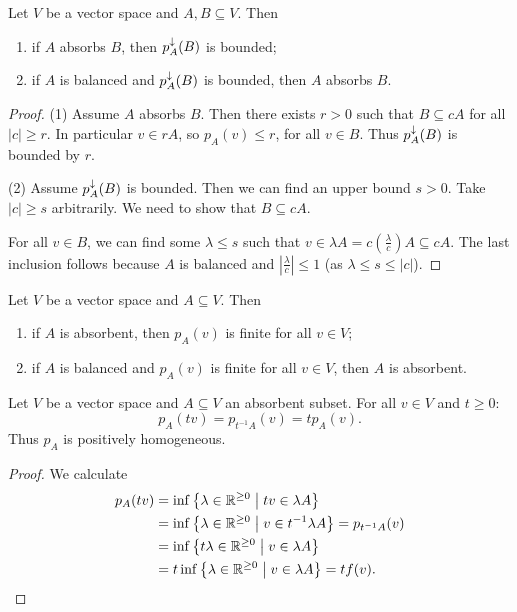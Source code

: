 \begin{lemma}
Let $V$ be a vector space and $A,B\subseteq V$. Then
\begin{enumerate}
\item if $A$ absorbs $B$, then $p_A^\downarrow(B)$ is bounded;
\item if $A$ is balanced and $p_A^\downarrow(B)$ is bounded, then $A$ absorbs $B$.
\end{enumerate}
\end{lemma}
\begin{proof}
(1) Assume $A$ absorbs $B$. Then there exists $r >0$ such that $B\subseteq cA$ for all $|c|\geq r$. In particular $v\in rA$, so $p_A(v) \leq r$, for all $v\in B$. Thus $p_A^\downarrow(B)$ is bounded by $r$.

(2) Assume $p_A^\downarrow(B)$ is bounded. Then we can find an upper bound $s>0$. Take $|c|\geq s$ arbitrarily. We need to show that $B\subseteq cA$.

For all $v\in B$, we can find some $\lambda \leq s$ such that $v\in\lambda A = c\left(\frac{\lambda}{c}\right)A \subseteq cA$. The last inclusion follows because $A$ is balanced and $\left|\frac{\lambda}{c}\right|\leq 1$ (as $\lambda \leq s \leq |c|$).
\end{proof}
\begin{corollary} \label{gaugeWellDefined}
Let $V$ be a vector space and $A\subseteq V$. Then
\begin{enumerate}
\item if $A$ is absorbent, then $p_A(v)$ is finite for all $v\in V$;
\item if $A$ is balanced and $p_A(v)$ is finite for all $v\in V$, then $A$ is absorbent.
\end{enumerate}
\end{corollary}

\begin{lemma} \label{gaugeScaling}
Let $V$ be a vector space and $A\subseteq V$ an absorbent subset. For all $v\in V$ and $t\geq 0$:
\[ p_A(tv) = p_{t^{-1}A}(v) = t p_A(v). \]
Thus $p_A$ is positively homogeneous.
\end{lemma}
\begin{proof}
We calculate
\begin{align*}
p_A(tv) &= \inf\left\{ \lambda\in \mathbb{R}^{\geq 0} \;\middle|\; tv\in \lambda A \right\} \\
&= \inf\left\{ \lambda\in \mathbb{R}^{\geq 0} \;\middle|\; v\in t^{-1}\lambda A \right\} = p_{t^{-1}A}(v) \\
&= \inf\left\{ t\lambda\in \mathbb{R}^{\geq 0} \;\middle|\; v\in \lambda A \right\} \\
&= t\inf\left\{ \lambda\in \mathbb{R}^{\geq 0} \;\middle|\; v\in \lambda A \right\} = tf(v).
\end{align*}
\end{proof}

